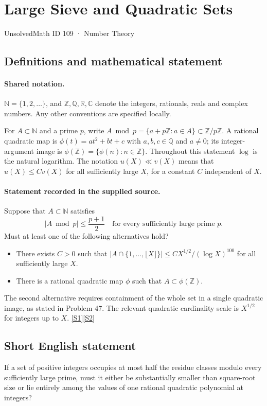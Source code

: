 \documentclass[11pt]{article}
\newcommand{\sref}[2]{\hyperlink{source:#1:#2}{[S#2]}}
\begin{document}
\setcounter{section}{108}
\section{Large Sieve and Quadratic Sets}\label{109}
{\small\sffamily UnsolvedMath ID 109 · Number Theory}
\subsection{Definitions and mathematical statement}

\paragraph{Shared notation.}$\mathbb N=\{1,2,\ldots\}$, and $\mathbb Z,\mathbb Q,\mathbb R,\mathbb C$ denote the integers, rationals, reals and complex numbers. Any other conventions are specified locally.


For $A\subset\mathbb N$ and a prime $p$, write $A\bmod p=\{a+p\mathbb Z:a\in A\}\subset\mathbb Z/p\mathbb Z$. A rational quadratic map is $\phi(t)=at^2+bt+c$ with $a,b,c\in\mathbb Q$ and $a\ne0$; its integer-argument image is $\phi(\mathbb Z)=\{\phi(n):n\in\mathbb Z\}$. Throughout this statement $\log$ is the natural logarithm. The notation $u(X)\ll v(X)$ means that $u(X)\le C v(X)$ for all sufficiently large $X$, for a constant $C$ independent of $X$.
\paragraph{Statement recorded in the supplied source.}
Suppose that $A\subset\mathbb N$ satisfies
\[
|A\bmod p|\le\frac{p+1}{2}\quad\text{for every sufficiently large prime }p.
\]
Must at least one of the following alternatives hold?
\begin{itemize}
\item There exists $C>0$ such that $|A\cap\{1,\ldots,\lfloor X\rfloor\}|\le C X^{1/2}/(\log X)^{100}$ for all sufficiently large $X$.
\item There is a rational quadratic map $\phi$ such that $A\subset\phi(\mathbb Z)$.
\end{itemize}
The second alternative requires containment of the whole set in a single quadratic image, as stated in Problem 47. The relevant quadratic cardinality scale is $X^{1/2}$ for integers up to $X$. \sref{109}{1}\sref{109}{2}
\subsection{Short English statement}
If a set of positive integers occupies at most half the residue classes modulo every sufficiently large prime, must it either be substantially smaller than square-root size or lie entirely among the values of one rational quadratic polynomial at integers?
\end{document}
